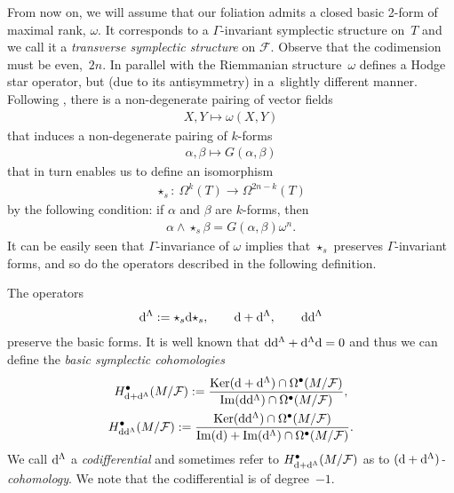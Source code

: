 \documentclass[10pt,a4paper]{amsart}
\numberwithin{equation}{section}
\begin{document}
From now on, we will assume that our foliation admits a closed basic 2-form of maximal rank, $\omega$. It corresponds to a $\Gamma$-invariant symplectic structure on~$T$ and we call it a \emph{transverse symplectic structure} on $\mathcal{F}$. Observe that the codimension must be even,~$2n$. In parallel with the Riemmanian structure~$\omega$ defines a Hodge star operator, but (due to its antisymmetry) in a~slightly different manner. Following \cite[Section~2.1]{brylinski}, there is a non-degenerate pairing of vector fields
\begin{gather*}
X, Y \mapsto \omega(X,Y)
\end{gather*}
that induces a non-degenerate pairing of $k$-forms
\begin{gather*}
\alpha, \beta \mapsto G(\alpha,\beta)
\end{gather*}
that in turn enables us to define an isomorphism
\begin{gather*}
\star_{s}\colon \ \Omega^{k}(T)\longrightarrow \Omega^{2n-k}(T)
\end{gather*}
by the following condition: if $\alpha$ and $\beta$ are $k$-forms, then
\begin{gather*}
\alpha\wedge \star_s\beta=G(\alpha,\beta)\omega^n.
\end{gather*}
It can be easily seen that $\Gamma$-invariance of $\omega$ implies that $\star_s$ preserves $\Gamma$-invariant forms, and so do the operators described in the following definition.
\begin{Definition}
The operators
\begin{gather*}
{\rm d}^{\Lambda}:=\star_s {\rm d} \star_s, \qquad {\rm d}+{\rm d}^{\Lambda},\qquad {\rm d}{\rm d}^{\Lambda}
\end{gather*}
preserve the basic forms. It is well known that ${\rm d}{\rm d}^{\Lambda}+{\rm d}^{\Lambda}{\rm d}=0$ and thus we can define the \emph{basic symplectic cohomologies}
\begin{gather*}
H^{\bullet}_{{\rm d}+{\rm d}^{\Lambda}}(M\slash\mathcal{F}):=\frac{\operatorname{Ker}({\rm d}+{\rm d}^{\Lambda})\cap \Omega^{\bullet}(M\slash\mathcal{F})}{\operatorname{Im}({\rm d}{\rm d}^{\Lambda})\cap \Omega^{\bullet}(M\slash\mathcal{F})},\\
H^{\bullet}_{{\rm d}{\rm d}^{\Lambda}}(M\slash\mathcal{F}):=\frac{\operatorname{Ker}({\rm d}{\rm d}^{\Lambda})\cap\Omega^{\bullet}(M\slash\mathcal{F})}{\operatorname{Im}({\rm d})+\operatorname{Im}({\rm d}^{\Lambda})\cap \Omega^{\bullet}(M\slash\mathcal{F})}.
\end{gather*}
We call ${\rm d}^{\Lambda}$ a \emph{codifferential} and sometimes refer to $H^{\bullet}_{{\rm d}+{\rm d}^{\Lambda}}(M\slash\mathcal{F})$ as to \emph{$({\rm d}+{\rm d}^{\Lambda})$-cohomology}. We note that the codifferential is of degree~$-1$.
\end{Definition}
\end{document}

